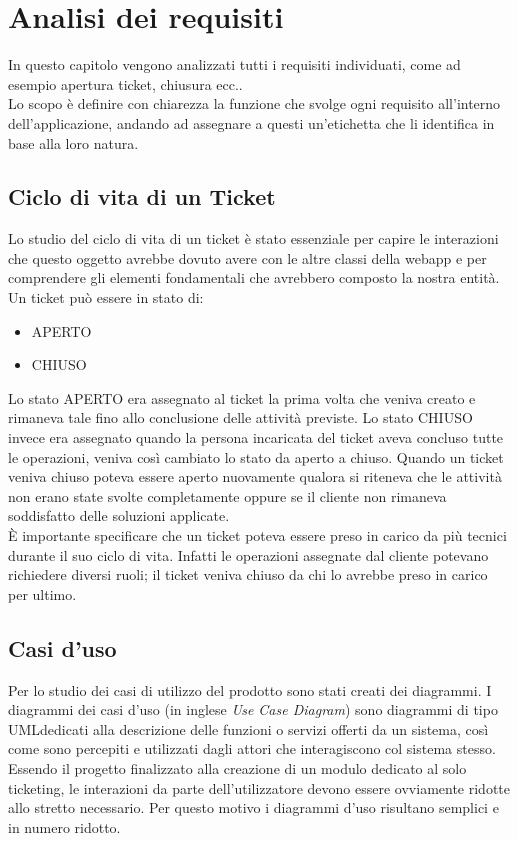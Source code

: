 \chapter{Analisi dei requisiti}
\label{cap:analisi-requisiti}

In questo capitolo vengono analizzati tutti i requisiti individuati, come ad esempio apertura ticket, chiusura ecc..\\
Lo scopo è definire con chiarezza la funzione che svolge ogni requisito all'interno dell'applicazione, andando  ad assegnare a questi un'etichetta che li identifica in base alla  loro natura.
\section{Ciclo di vita di un Ticket}
Lo studio del ciclo di vita di un ticket è stato essenziale per capire le interazioni che questo oggetto avrebbe dovuto avere con le altre classi della webapp e per comprendere gli elementi fondamentali che avrebbero composto la nostra entità. \\
Un ticket può essere in stato di:
\begin{itemize}
\item APERTO
\item CHIUSO
\end{itemize}
Lo stato APERTO era assegnato al ticket la prima volta che veniva creato e rimaneva tale fino allo conclusione delle attività previste.
Lo stato CHIUSO invece era assegnato quando la persona incaricata del ticket aveva concluso tutte le operazioni, veniva così cambiato lo stato da aperto a chiuso.
Quando un ticket veniva chiuso poteva essere aperto nuovamente qualora si riteneva che le attività non erano state svolte completamente oppure se il cliente non rimaneva soddisfatto delle soluzioni applicate.\\
È importante specificare che un ticket poteva essere preso in carico da più tecnici durante il suo ciclo di vita. Infatti le operazioni assegnate dal cliente potevano richiedere diversi ruoli; il ticket veniva chiuso da chi lo avrebbe preso in carico per ultimo.
\section{Casi d'uso}

Per lo studio dei casi di utilizzo del prodotto sono stati creati dei diagrammi.
I diagrammi dei casi d'uso (in inglese \emph{Use Case Diagram}) sono diagrammi di tipo UML\glsfirstoccur dedicati alla descrizione delle funzioni o servizi offerti da un sistema, così come sono percepiti e utilizzati dagli attori che interagiscono col sistema stesso.
Essendo il progetto finalizzato alla creazione di un modulo dedicato al solo ticketing, le interazioni da parte dell'utilizzatore devono essere ovviamente ridotte allo stretto necessario. Per questo motivo i diagrammi d'uso risultano semplici e in numero ridotto.

